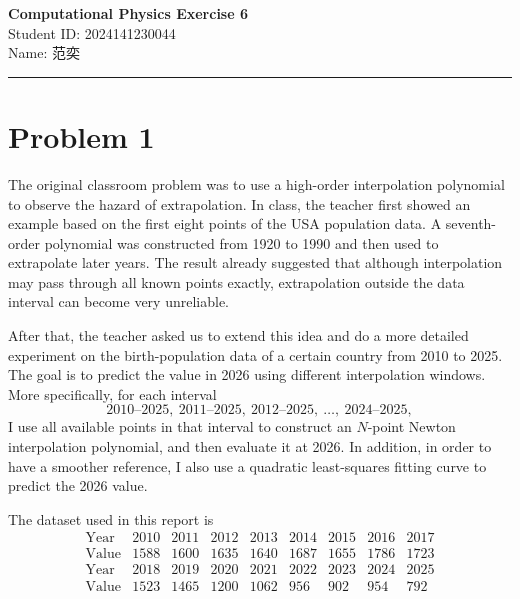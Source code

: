 \documentclass[12pt,a4paper]{article}
\newcommand{\HomeworkTitle}{Computational Physics Exercise 6}
\newcommand{\StudentID}{2024141230044}
\newcommand{\StudentName}{范奕}
\begin{document}
\begin{center}
    {\LARGE \textbf{\HomeworkTitle}}\\[1.2em]
    {\large Student ID: \StudentID}\\[0.5em]
    {\large Name: \StudentName}
\end{center}

\vspace{1em}
\noindent\rule{\textwidth}{0.8pt}
\vspace{1.5em}

\section*{Problem 1}

The original classroom problem was to use a high-order interpolation polynomial to observe the hazard of extrapolation. In class, the teacher first showed an example based on the first eight points of the USA population data. A seventh-order polynomial was constructed from 1920 to 1990 and then used to extrapolate later years. The result already suggested that although interpolation may pass through all known points exactly, extrapolation outside the data interval can become very unreliable.

After that, the teacher asked us to extend this idea and do a more detailed experiment on the birth-population data of a certain country from 2010 to 2025. The goal is to predict the value in 2026 using different interpolation windows. More specifically, for each interval
\[
2010\text{--}2025,\ 2011\text{--}2025,\ 2012\text{--}2025,\ \ldots,\ 2024\text{--}2025,
\]
I use all available points in that interval to construct an \(N\)-point Newton interpolation polynomial, and then evaluate it at 2026. In addition, in order to have a smoother reference, I also use a quadratic least-squares fitting curve to predict the 2026 value.

The dataset used in this report is
\[
\begin{array}{c|cccccccc}
\text{Year} & 2010 & 2011 & 2012 & 2013 & 2014 & 2015 & 2016 & 2017 \\
\hline
\text{Value} & 1588 & 1600 & 1635 & 1640 & 1687 & 1655 & 1786 & 1723
\end{array}
\]
\[
\begin{array}{c|cccccccc}
\text{Year} & 2018 & 2019 & 2020 & 2021 & 2022 & 2023 & 2024 & 2025 \\
\hline
\text{Value} & 1523 & 1465 & 1200 & 1062 & 956 & 902 & 954 & 792
\end{array}
\]
\end{document}
